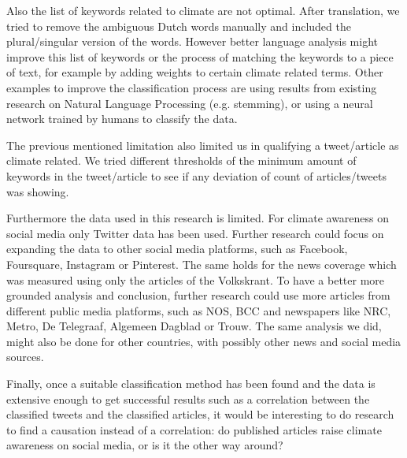 \documentclass[paper=a4, fontsize=9px]{scrartcl} %
\numberwithin{equation}{section} %
\numberwithin{figure}{section} %
\numberwithin{table}{section} %
\begin{document}
\begin{multicols}{2}
Also the list of keywords related to climate are not optimal. After translation, we tried to remove the ambiguous Dutch words manually and included the plural/singular version of the words. However better language analysis might improve this list of keywords or the process of matching the keywords to a piece of text, for example by adding weights to certain climate related terms. Other examples to improve the classification process are using results from existing research on Natural Language Processing (e.g. stemming), or using a neural network trained by humans to classify the data. 

The previous mentioned limitation also limited us in qualifying a tweet/article as climate related. We tried different thresholds of the minimum amount of keywords in the tweet/article to see if any deviation of count of articles/tweets was showing. 

Furthermore the data used in this research is limited. For climate awareness on social media only Twitter data has been used. Further research could focus on expanding the data to other social media platforms, such as Facebook, Foursquare, Instagram or Pinterest. The same holds for the news coverage which was measured using only the articles of the Volkskrant. To have a better more grounded analysis and conclusion, further research could use more articles from different public media platforms, such as NOS, BCC and newspapers like NRC, Metro, De Telegraaf, Algemeen Dagblad or Trouw. The same analysis we did, might also be done for other countries, with possibly other news and social media sources.

Finally, once a suitable classification method has been found and the data is extensive enough to get successful results such as a correlation between the classified tweets and the classified articles, it would be interesting to do research to find a causation instead of a correlation: do published articles raise climate awareness on social media, or is it the other way around?

\end{multicols}
\end{document}
